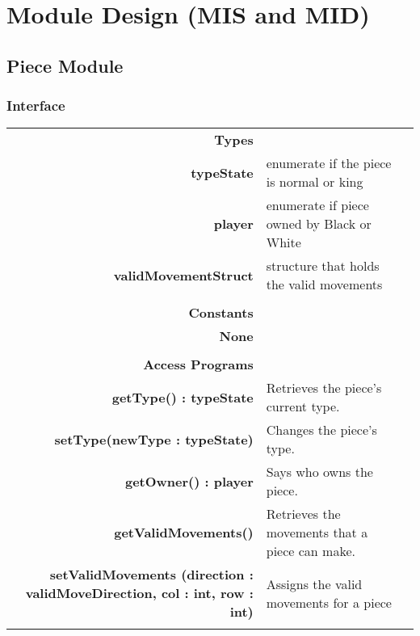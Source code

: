 \documentclass[10pt]{article}
\makeatletter
\newcommand{\CustomLabel}[1]{\Hy@raisedlink{\hypertarget{#1}{}}\label{#1}}
\makeatother
\begin{document}
\section{Module Design (MIS and MID)}


       
    \subsection{Piece Module}\CustomLabel{mis:Piece}
    \subsubsection{Interface}
        \begin{tabularx}{\linewidth}{@{} >{\bfseries}r Xp{5cm} }
            Types           & \begin{tabular}[t]{@{} l p{8cm}} 
                                     & \\
                                    typeState & enumerate if the piece is normal or king \\
                                    player & enumerate if piece owned by Black or White \\
									validMovementStruct & structure that holds the valid movements\\
                              \end{tabular} \\
                              
            Constants       & \begin{tabular}[t]{@{} l p{8cm}} 
                                     & \\
                                    None & \\
                              \end{tabular} \\

            Access Programs & \begin{tabular}[t]{@{} l p{8cm}}
                                     & \\
                                    getType() : typeState & Retrieves the piece's current type. \\
                                    setType(newType : typeState) & Changes the piece's type. \\ 
                                    getOwner() : player & Says who owns the piece. \\
									getValidMovements() & Retrieves the movements that a piece can make.\\
									setValidMovements (direction : validMoveDirection, col : int, row : int) & Assigns the valid movements for a piece\\
                              \end{tabular}
        \end{tabularx}
        
\end{document}
